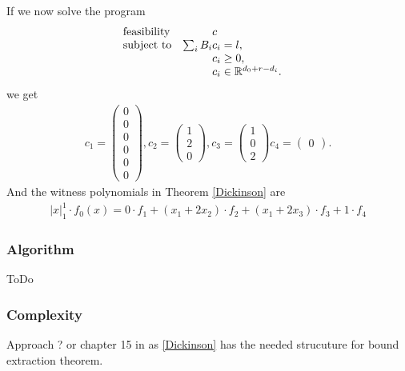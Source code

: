\documentclass[./main.tex]{subfiles}
\begin{document}
If we now solve the program
\begin{equation*}
\begin{array}{ll@{}ll}
\text{feasibility}  & &c &\\
\text{subject to}& \sum_i B_i &c_i = l,  &\\
& &c_i \geq 0,  &\\
                 &&c_i \in \mathbb{R}^{d_0+r-d_i}.              
\end{array}
\end{equation*}
we get
\begin{align*}
c_1 = \begin{pmatrix}
0\\0\\0\\0\\0\\0
\end{pmatrix},
c_2= \begin{pmatrix}
1 \\ 2 \\ 0
\end{pmatrix},
c_3= \begin{pmatrix}
1 \\ 0 \\ 2
\end{pmatrix}
c_4= \begin{pmatrix}
0
\end{pmatrix}.
\end{align*}
And the witness polynomials in Theorem \ref{Dickinson} are
\begin{align*}
\vert x \vert_1^1 \cdot f_0(x) = 0\cdot f_1 + (x_1+2x_2)\cdot f_2 +(x_1 + 2x_3)\cdot f_3 + 1 \cdot f_4
\end{align*}
\subsubsection{Algorithm}
ToDo
\subsubsection{Complexity}
Approach  \cite{delzell1996kreisel}? or chapter 15 in \cite{kohlenbach2008applied} as \ref{Dickinson} has the needed strucuture for bound extraction theorem.
\end{document}
